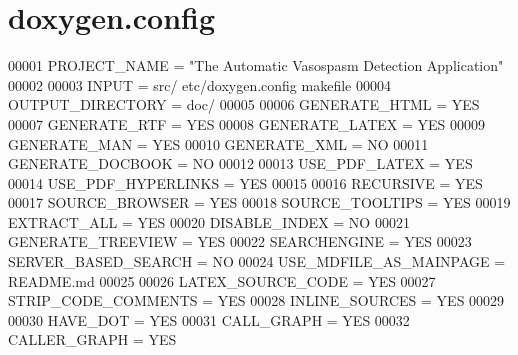 \hypertarget{doxygen_8config_source}{\section{doxygen.\+config}
\label{doxygen_8config_source}
}

\begin{DoxyCode}
00001 PROJECT\_NAME = "The Automatic Vasospasm Detection Application"
00002 
00003 INPUT = src/ etc/doxygen.config makefile
00004 OUTPUT\_DIRECTORY = doc/
00005 
00006 GENERATE\_HTML = YES
00007 GENERATE\_RTF = YES
00008 GENERATE\_LATEX = YES
00009 GENERATE\_MAN = YES
00010 GENERATE\_XML = NO
00011 GENERATE\_DOCBOOK = NO
00012 
00013 USE\_PDF\_LATEX = YES
00014 USE\_PDF\_HYPERLINKS = YES
00015 
00016 RECURSIVE = YES
00017 SOURCE\_BROWSER = YES
00018 SOURCE\_TOOLTIPS = YES
00019 EXTRACT\_ALL = YES
00020 DISABLE\_INDEX = NO
00021 GENERATE\_TREEVIEW = YES
00022 SEARCHENGINE = YES
00023 SERVER\_BASED\_SEARCH = NO
00024 USE\_MDFILE\_AS\_MAINPAGE = README.md
00025 
00026 LATEX\_SOURCE\_CODE = YES
00027 STRIP\_CODE\_COMMENTS = YES
00028 INLINE\_SOURCES = YES
00029 
00030 HAVE\_DOT = YES
00031 CALL\_GRAPH = YES
00032 CALLER\_GRAPH = YES
\end{DoxyCode}
